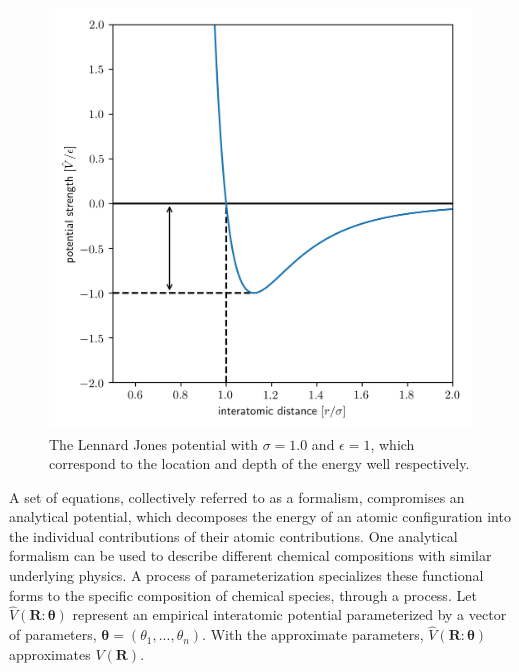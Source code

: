 \begin{figure}[h]
  \centering
    \includegraphics[width=5in]{chapter3/lj}
    \caption[The Lennard Jones Potential]{The Lennard Jones potential with $\sigma=1.0$ and $\epsilon=1$, which correspond to the location and depth of the energy well respectively.}
		\label{fig:lj_potential}
\end{figure}

A set of equations, collectively referred to as a formalism, compromises an analytical potential, which decomposes the energy of an atomic configuration into the individual contributions of their atomic contributions.
One analytical formalism can be used to describe different chemical compositions with similar underlying physics.  A process of parameterization specializes these functional forms to the specific composition of chemical species, through a process.
Let $\hat{V}(\bm{R}:\bm{\theta})$ represent an empirical interatomic potential  parameterized by a vector of parameters, $\bm{\theta}=(\theta_1,...,\theta_n)$.  With the approximate parameters, $\hat{V}(\bm{R}:\bm{\theta})$ approximates $V(\bm{R})$.

